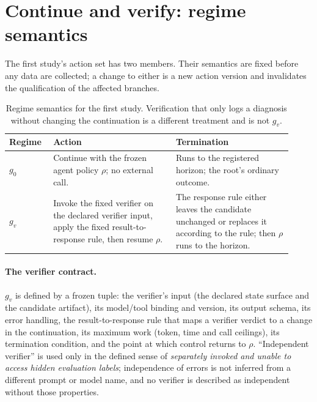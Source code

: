 \section{Continue and verify: regime semantics}
\label{sec:b-regimes}

The first study's action set has two members.  Their semantics are fixed
before any data are collected; a change to either is a new action version and
invalidates the qualification of the affected branches.

\begin{table}[t]
\centering
\small
\setlength{\tabcolsep}{4pt}
\begin{tabular}{@{}p{0.14\linewidth}p{0.40\linewidth}p{0.38\linewidth}@{}}
\toprule
Regime & Action & Termination \\
\midrule
$g_0$ & Continue with the frozen agent policy $\rho$; no external call. & Runs to the registered horizon; the root's ordinary outcome. \\
$g_v$ & Invoke the fixed verifier on the declared verifier input, apply the fixed result-to-response rule, then resume $\rho$. & The response rule either leaves the candidate unchanged or replaces it according to the rule; then $\rho$ runs to the horizon. \\
\bottomrule
\end{tabular}
\caption{Regime semantics for the first study.  Verification that only logs a
diagnosis without changing the continuation is a different treatment and is not
$g_v$.}
\label{tab:option-boundaries}
\end{table}

\paragraph{The verifier contract.}
$g_v$ is defined by a frozen tuple: the verifier's input (the declared state
surface and the candidate artifact), its model/tool binding and version, its
output schema, its error handling, the result-to-response rule that maps a
verifier verdict to a change in the continuation, its maximum work (token,
time and call ceilings), its termination condition, and the point at which
control returns to $\rho$.  ``Independent verifier'' is used only in the defined
sense of \emph{separately invoked and unable to access hidden evaluation
labels}; independence of errors is not inferred from a different prompt or model
name, and no verifier is described as independent without those properties.

